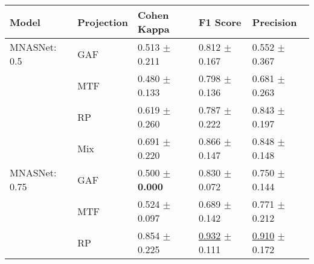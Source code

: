 
\begin{tabular}[t]{lllll}
\toprule
Model & Projection & Cohen Kappa & F1 Score & Precision \\
\midrule
MNASNet: 0.5 & GAF & \textcolor[rgb]{0.9262152778,0.0737847222,0}{0.513} $\pm$ \textcolor[rgb]{0.7080678936,0.2919321064,0}{0.211} & \textcolor[rgb]{0.5381165919,0.4618834081,0}{0.812} $\pm$ \textcolor[rgb]{0.5971660531,0.4028339469,0}{0.167} & \textcolor[rgb]{1.0000000000,0.0000000000,0}{0.552} $\pm$ \textcolor[rgb]{0.7965410773,0.2034589227,0}{0.367} \\
 & MTF & \textcolor[rgb]{1.0000000000,0.0000000000,0}{0.480} $\pm$ \textcolor[rgb]{0.4448004357,0.5000000000,0}{0.133} & \textcolor[rgb]{0.5911129230,0.4088870770,0}{0.798} $\pm$ \textcolor[rgb]{0.4190016102,0.5000000000,0}{0.136} & \textcolor[rgb]{0.6725663717,0.3274336283,0}{0.681} $\pm$ \textcolor[rgb]{0.4752162039,0.5000000000,0}{0.263} \\
 & RP & \textcolor[rgb]{0.6811342593,0.3188657407,0}{0.619} $\pm$ \textcolor[rgb]{0.8705171556,0.1294828444,0}{0.260} & \textcolor[rgb]{0.6327852516,0.3672147484,0}{0.787} $\pm$ \textcolor[rgb]{0.9160861823,0.0839138177,0}{0.222} & \textcolor[rgb]{0.2595870206,0.5000000000,0}{0.843} $\pm$ \textcolor[rgb]{0.2721920318,0.5000000000,0}{0.197} \\
 & Mix & \textcolor[rgb]{0.5173611111,0.4826388889,0}{0.691} $\pm$ \textcolor[rgb]{0.7376661777,0.2623338223,0}{0.220} & \textcolor[rgb]{0.3334692214,0.5000000000,0}{0.866} $\pm$ \textcolor[rgb]{0.4801073549,0.5000000000,0}{0.147} & \textcolor[rgb]{0.2445695897,0.5000000000,0}{0.848} $\pm$ \textcolor[rgb]{0.1202871709,0.5000000000,0}{0.148} \\
MNASNet: 0.75 & GAF & \textcolor[rgb]{0.9548611111,0.0451388889,0}{0.500} $\pm$ \textbf{\textcolor[rgb]{0.0000000000,0.5000000000,0}{0.000}} & \textcolor[rgb]{0.4702114029,0.5000000000,0}{0.830} $\pm$ \textcolor[rgb]{0.0466573321,0.5000000000,0}{0.072} & \textcolor[rgb]{0.4955752212,0.5000000000,0}{0.750} $\pm$ \textcolor[rgb]{0.1082889146,0.5000000000,0}{0.144} \\
 & MTF & \textcolor[rgb]{0.9007523148,0.0992476852,0}{0.524} $\pm$ \textcolor[rgb]{0.3253529221,0.5000000000,0}{0.097} & \textcolor[rgb]{1.0000000000,0.0000000000,0}{0.689} $\pm$ \textcolor[rgb]{0.4554998381,0.5000000000,0}{0.142} & \textcolor[rgb]{0.4424778761,0.5000000000,0}{0.771} $\pm$ \textcolor[rgb]{0.3187149609,0.5000000000,0}{0.212} \\
 & RP & \textcolor[rgb]{0.1432291667,0.5000000000,0}{0.854} $\pm$ \textcolor[rgb]{0.7546426383,0.2453573617,0}{0.225} & \underline{\textcolor[rgb]{0.0866965620,0.5000000000,0}{0.932}} $\pm$ \textcolor[rgb]{0.2745659800,0.5000000000,0}{0.111} & \underline{\textcolor[rgb]{0.0884955752,0.5000000000,0}{0.910}} $\pm$ \textcolor[rgb]{0.1940527150,0.5000000000,0}{0.172} \\

\end{tabular}
